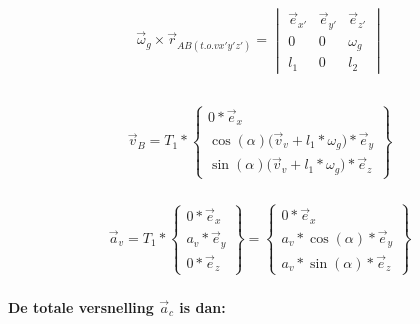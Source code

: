 \documentclass[a4paper,10pt]{article}
\begin{document}
\begin{equation}
	\begin{aligned}
		\vec{\omega}_g \times \vec{r}_{AB(t.o.v x'y'z')} =  \begin{vmatrix}
			\vec{e}_{x'}& \vec{e}_{y'} & \vec{e}_{z'}\\
			0 & 0 &  \omega_g \\		
			l_1 & 0 & l_2
		\end{vmatrix}\\
	\end{aligned}
\end{equation}\\
\begin{equation}
	\begin{aligned}
		\vec{v}_B = {T}_{1}* \begin{Bmatrix}
			{0*\vec{e}_{x}}\\
			\cos(\alpha)\Big(\vec{v}_v + l_1*\omega_g \Big)*\vec{e}_{y}\\
			\sin(\alpha)\Big(\vec{v}_v + l_1*\omega_g\Big)*\vec{e}_{z} 
		\end{Bmatrix}
	\end{aligned}
\end{equation}\\
\begin{equation}
	\begin{aligned}
		\vec{a}_v = {T}_{1}* \begin{Bmatrix}
			{0*\vec{e}_{x}}\\
			a_v*\vec{e}_{y}\\
			0*\vec{e}_{z} 
		\end{Bmatrix} = \begin{Bmatrix}
		{0*\vec{e}_{x}}\\
		a_v*\cos(\alpha)*\vec{e}_{y}\\
		a_v*\sin(\alpha)*\vec{e}_{z} 
	\end{Bmatrix}
\end{aligned}
\end{equation}\\
\textbf{De totale versnelling $\vec{a}_c$ is dan:}
\end{document}
